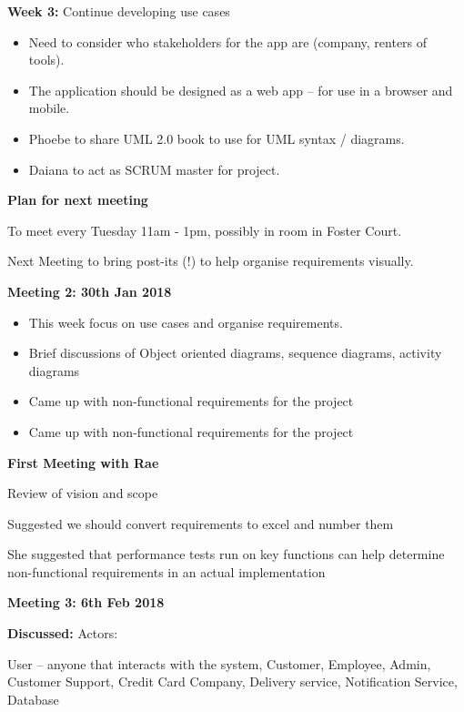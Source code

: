 \textbf{Week 3:} Continue developing use cases

\begin{itemize}
  \item Need to consider who stakeholders for the app are (company, renters of tools).
  \item The application should be designed as a web app – for use in a browser and mobile.
  \item Phoebe to share UML 2.0 book to use for UML syntax / diagrams.
  \item Daiana to act as SCRUM master for project.


\end{itemize}


\textbf{Plan for next meeting}

To meet every Tuesday 11am - 1pm, possibly in room in Foster Court.

Next Meeting to bring post-its (!) to help organise requirements visually.

\textbf{Meeting 2: 30th Jan 2018}



\begin{itemize}
  \item This week focus on use cases and organise requirements.
  \item Brief discussions of Object oriented diagrams, sequence diagrams, activity diagrams
  \item Came up with non-functional requirements for the project
  \item Came up with non-functional requirements for the project
 
\end{itemize}



\textbf{First Meeting with Rae}

Review of vision and scope

Suggested we should convert requirements to excel and number them

She suggested that performance tests run on key functions can help determine non-functional requirements in an actual implementation

\textbf{Meeting 3: 6th Feb 2018}

\textbf{Discussed:}
Actors:

User – anyone that interacts with the system, Customer, Employee, Admin, Customer Support, Credit Card Company, Delivery service, Notification Service, Database

